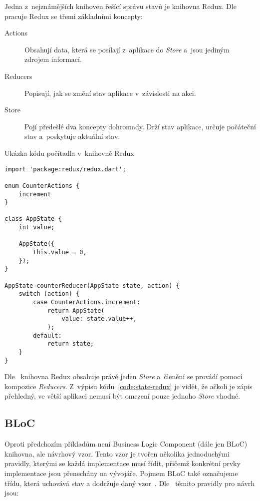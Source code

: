 Jedna z~nejznámějších knihoven řešící správu stavů je knihovna Redux.
Dle~\cite{redux_basics} pracuje Redux se třemi základními koncepty:

\begin{description}
    \item[Actions] Obsahují data,
    která se posílají z~aplikace do \emph{Store}
    a~jsou jediným zdrojem informací.
    \item[Reducers] Popisují, jak se změní stav aplikace v~závislosti na akci.
    \item[Store] Pojí předešlé dva koncepty dohromady.
    Drží stav aplikace,
    určuje počáteční stav
    a~poskytuje aktuální stav.
\end{description}

\begin{listing}
    \caption{Ukázka kódu počítadla v~knihovně Redux~\cite{redux_basics}}
    \label{code:state-redux}
    \begin{verbatim}
import 'package:redux/redux.dart';

enum CounterActions {
    increment
}

class AppState {
    int value;

    AppState({ 
        this.value = 0,
    });
}

AppState counterReducer(AppState state, action) {
    switch (action) {
        case CounterActions.increment:
            return AppState(
                value: state.value++,
            );
        default:
            return state;
    }
}
    \end{verbatim}
\end{listing}

Dle~\cite{redux_basics} knihovna Redux obsahuje právě jeden \emph{Store}
a~členění se provádí pomocí kompozice \emph{Reducers}.
Z~výpisu kódu~\ref{code:state-redux} je vidět,
že ačkoli je zápis přehledný,
ve větší aplikaci nemusí být omezení pouze jednoho \emph{Store} vhodné.

\subsection{BLoC}

Oproti předchozím příkladům není Business Logic Component (dále jen BLoC)
knihovna,
ale návrhový vzor.
Tento vzor je tvořen několika jednoduchými pravidly,
kterými se každá implementace musí řídit,
přičemž konkrétní prvky implementace jsou přenechány na
vývojáře.
Pojmem BLoC také označujeme třídu,
která uchovává stav a dodržuje daný vzor~\cite{googledevelopers_bloc}. 
Dle~\cite{googledevelopers_bloc} těmito pravidly pro návrh jsou:

